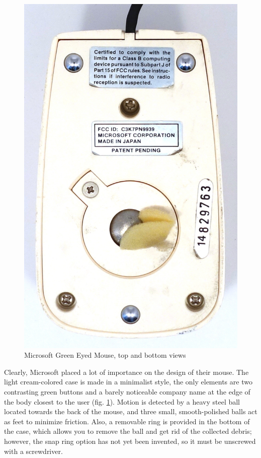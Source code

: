 \documentclass[11pt, a4paper]{article}
\begin{document}
\begin{figure}[h]
    \includegraphics[scale=0.6]{1983_microsoft_green_eyed_mouse/bottom_60.jpg}
    \caption{Microsoft Green Eyed Mouse, top and bottom views}
    \label{fig:MicrosoftGreenEyedTopAndBottom}
\end{figure}

Clearly, Microsoft placed a lot of importance on the design of their mouse. The light cream-colored case is made in a minimalist style, the only elements are two contrasting green buttons and a barely noticeable company name at the edge of the body closest to the user (fig. \ref{fig:MicrosoftGreenEyedTopAndBottom}). Motion is detected by a heavy steel ball located towards the back of the mouse, and three small, smooth-polished balls act as feet to minimize friction. Also, a removable ring is provided in the bottom of the case, which allows you to remove the ball and get rid of the collected debris; however, the snap ring option has not yet been invented, so it must be unscrewed with a screwdriver.
\end{document}
